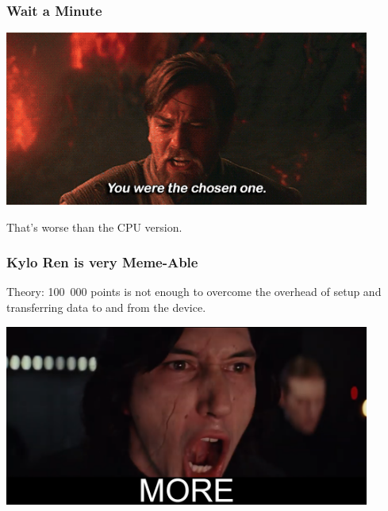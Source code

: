 \begin{frame}
\frametitle{Wait a Minute}

\begin{center}
	\includegraphics[width=0.9\textwidth]{images/chosenone.png}
\end{center}

 That's worse than the CPU version. 
 

\end{frame}

\begin{frame}
\frametitle{Kylo Ren is very Meme-Able}

Theory: 100~000 points is not enough to overcome the overhead of setup and transferring data to and from the device. 
  
\begin{center}
	\includegraphics[width=0.9\textwidth]{images/more.png}
\end{center}
  
\end{frame}

